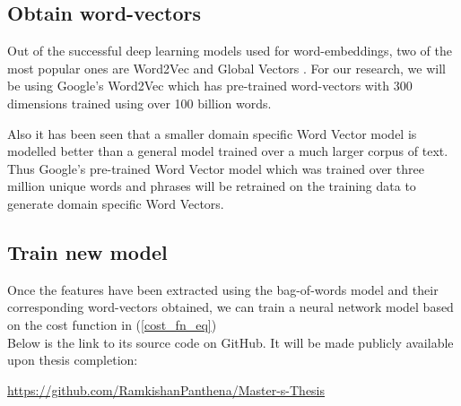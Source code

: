 








\subsection{Obtain word-vectors}

Out of the successful deep learning models used for word-embeddings, two of the most popular ones are Word2Vec \cite{le2014distributed} and Global Vectors \cite{pennington2014glove}. For our research, we will be using Google's Word2Vec which has pre-trained word-vectors with 300 dimensions trained using over 100 billion words. 

Also it has been seen that a smaller domain specific Word Vector model is modelled better than a general model trained over a much larger corpus of text. Thus Google's pre-trained Word Vector model which was trained over three million unique words and phrases will be retrained on the training data to generate domain specific Word Vectors.

\subsection{Train new model}

Once the features have been extracted using the bag-of-words model and their corresponding word-vectors obtained, we can train a neural network model based on the cost function in (\ref{cost_fn_eq})\\

\noindent Below is the link to its source code on GitHub. It will be made publicly available upon thesis completion:

\noindent \url{https://github.com/RamkishanPanthena/Master-s-Thesis}